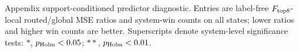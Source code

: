 \begin{table}[tbp]
\centering
\caption{Appendix support-conditioned predictor diagnostic. Entries are label-free \(F_{\rm top8}\)-local routed/global MSE ratios and system-win counts on all states; lower ratios and higher win counts are better. Superscripts denote system-level significance tests: \(\ast\), \(p_{\rm Holm}<0.05\); \(\ast\ast\), \(p_{\rm Holm}<0.01\).}
\label{tab:self_routing}
\setlength{\tabcolsep}{2pt}
\resizebox{0.78\textwidth}{!}{}
\end{table}
